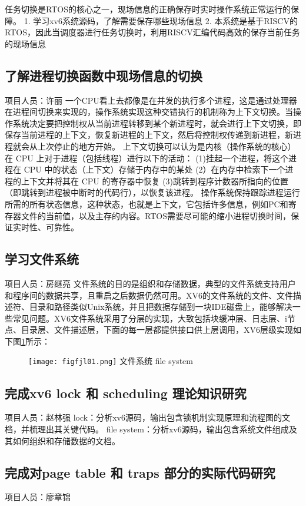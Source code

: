 任务切换是RTOS的核心之一，现场信息的正确保存时实时操作系统正常运行的保障。
1. 学习xv6系统源码，了解需要保存哪些现场信息
2. 本系统是基于RISCV的RTOS，因此当调度器进行任务切换时，利用RISCV汇编代码高效的保存当前任务的现场信息
\subsection{了解进程切换函数中现场信息的切换}
项目人员：许丽
一个CPU看上去都像是在并发的执行多个进程，这是通过处理器在进程间切换来实现的，操作系统实现这种交错执行的机制称为上下文切换。当操作系统决定要把控制权从当前进程转移到某个新进程时，就会进行上下文切换，即保存当前进程的上下文，恢复新进程的上下文，然后将控制权传递到新进程，新进程就会从上次停止的地方开始。
上下文切换可以认为是内核（操作系统的核心）在 CPU 上对于进程（包括线程）进行以下的活动：
(1)挂起一个进程，将这个进程在 CPU 中的状态（上下文）存储于内存中的某处
(2）在内存中检索下一个进程的上下文并将其在 CPU 的寄存器中恢复
(3)跳转到程序计数器所指向的位置（即跳转到进程被中断时的代码行），以恢复该进程。
操作系统保持跟踪进程运行所需的所有状态信息，这种状态，也就是上下文，它包括许多信息，例如PC和寄存器文件的当前值，以及主存的内容。RTOS需要尽可能的缩小进程切换时间，保证实时性、可靠性。

\subsection{学习文件系统}
项目人员：房继亮
文件系统的目的是组织和存储数据，典型的文件系统支持用户和程序间的数据共享，且重启之后数据仍然可用。XV6的文件系统的文件、文件描述符、目录和路径类似Unix系统，并且把数据存储到一块IDE磁盘上，能够解决一些常见问题。XV6文件系统采用了分层的实现，大致包括块缓冲层、日志层、i节点、目录层、文件描述层，下面的每一层都提供接口供上层调用，XV6层级实现如下图\ref{fig:figfjl01}所示：
\begin{figure}[!htb]
	\centering
	\texttt{[image: figfjl01.png]}
	\bicaption
	{文件系统} %
	{file system}  %
	\label{fig:figfjl01}
\end{figure}

\subsection{完成xv6 lock 和 scheduling 理论知识研究}
项目人员：赵林强
lock：分析xv6源码，输出包含锁机制实现原理和流程图的文档，并梳理出其关键代码。
file system：分析xv6源码，输出包含系统文件组成及其如何组织和存储数据的文档。
\subsection{完成对page table 和 traps 部分的实际代码研究}
项目人员：廖章锦

